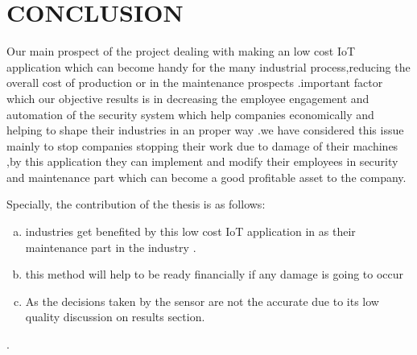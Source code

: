 \chapter{CONCLUSION}
Our main prospect of the project dealing with making an low cost IoT application which can become handy for the many industrial process,reducing the overall cost of production or in the maintenance prospects .important factor which our objective results is in decreasing the employee engagement and automation of the security system which help companies economically and helping to shape their industries in an proper way .we have considered this issue mainly to stop companies stopping their work due to damage of their machines ,by this application they can implement and modify their employees in security and maintenance part which can become a good profitable asset to the company.



Specially, the contribution of the thesis is as follows:

\begin{enumerate}[(a)]
\item industries get benefited by this low cost  IoT application in as their maintenance part in the industry .
\item this method will help to be ready financially  if any damage is going to occur 
\item As the decisions taken by the sensor are not the accurate due to its low quality
discussion on results section.
\end{enumerate}

.